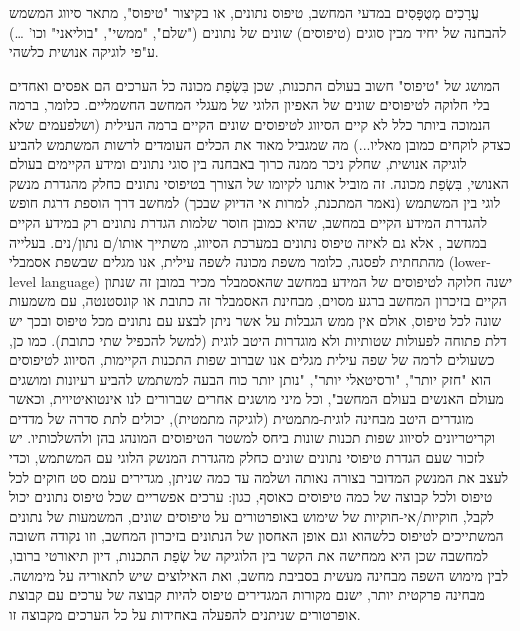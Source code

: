       עֲרָכִים מְטֻפָּסִים
      במדעי המחשב, טיפוס נתונים, או בקיצור "טיפוס", מתאר סיווג המשמש להבחנה של יחיד מבין סוגים (טיפוסים) שונים של נתונים ("שלם", "ממשי", "בוליאני" וכו' …) ע"פי לוגיקה אנושית כלשהי.

      המושג של "טיפוס" חשוב בעולם התכנות, שכן בִּשְׂפַת מכונה כל הערכים הם אפסים ואחדים
      בלי חלוקה לטיפוסים שונים של האפיון הלוגי של מעגלי המחשב החשמליים. כלומר, ברמה
      הנמוכה ביותר כלל לא קיים הסיווג לטיפוסים שונים הקיים ברמה העילית (ושלפעמים שלא
      כצדק לוקחים כמובן מאליו...) מה שמגביל מאוד את הכלים העומדים לרשות המשתמש להביע
      לוגיקה אנושית, שחלק ניכר ממנה כרוך באבחנה בין סוגי נתונים ומידע הקיימים בעולם
      האנושי, בִּשְׂפַת מכונה. זה מוביל אותנו לקיומו של הצורך בטיפוסי נתונים כחלק מהגדרת
      מנשק לוגי בין המשתמש (נאמר המתכנת, למרות אי הדיוק שבכך) למחשב דרך הוספת דרגת
      חופש להגדרת המידע הקיים במחשב, שהיא כמובן חוסר שלמות הגדרת נתונים רק במידע
      הקיים במחשב , אלא גם לאיזה טיפוס נתונים במערכת הסיווג, משתייך אותו/ם נתון/נים.
      בעלייה מהתחתית לפסגה, כלומר משפת מכונה לשפה עילית, אנו מגלים שבשפת אסמבלי
      (lower-level language) ישנה חלוקה לטיפוסים של המידע במחשב שהאסמבלר מכיר במובן
      זה שנתון הקיים בזיכרון המחשב ברגע מסוים, מבחינת האסמבלר זה כתובת או קונסטנטה,
      עם משמעות שונה לכל טיפוס, אולם אין ממש הגבלות על אשר ניתן לבצע עם נתונים מכל
      טיפוס ובכך יש דלת פתוחה לפעולות שטותיות ולא מוגדרות היטב לוגית (למשל להכפיל שתי
      כתובת). כמו כן, כשעולים לרמה של שפה עילית מגלים אנו שברוב שפות התכנות הקיימות,
      הסיווג לטיפוסים הוא "חזק יותר", "ורסיטאלי יותר", "נותן יותר כוח הבעה למשתמש
      להביע רעיונות ומושגים מעולם האנשים בעולם המחשב", וכל מיני מושגים אחרים שברורים
      לנו אינטואיטיוית, וכאשר מוגדרים היטב מבחינה לוגית-מתמטית (לוגיקה מתמטית),
      יכולים לתת סדרה של מדדים וקריטריונים לסיווג שפות תכנות שונות ביחס למשטר
      הטיפוסים המונהג בהן ולהשלכותיו. יש לזכור שעם הגדרת טיפוסי נתונים שונים כחלק
      מהגדרת המנשק הלוגי עם המשתמש, וכדי לעצב את המנשק המדובר בצורה נאותה ושלמה עד
      כמה שניתן, מגדירים עמם סט חוקים לכל טיפוס ולכל קבוצה של כמה טיפוסים כאוסף,
      כגון: ערכים אפשריים שכל טיפוס נתונים יכול לקבל, חוקיות/אי-חוקיות של שימוש
      באופרטורים על טיפוסים שונים, המשמעות של נתונים המשתייכים לטיפוס כלשהוא וגם אופן
      האחסון של הנתונים בזיכרון המחשב, וזו נקודה חשובה למחשבה שכן היא ממחישה את הקשר
      בין הלוגיקה של שְׂפַת התכנות, דיון תיאורטי ברובו, לבין מימוש השפה מבחינה מעשית
      בסביבת מחשב, ואת האילוצים שיש לתאוריה על מימושה. מבחינה פרקטית יותר, ישנם
      מקורות המגדירים טיפוס להיות קבוצה של ערכים עם קבוצת אופרטורים שניתנים להפעלה
      באחידות על כל הערכים מקבוצה זו.

